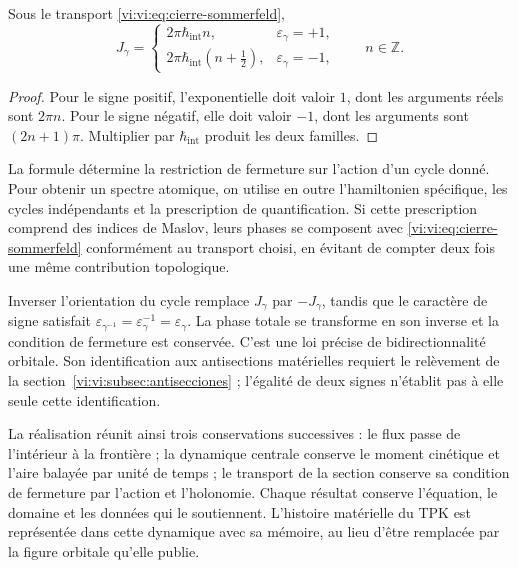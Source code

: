 \begin{theorem}
\label{vi:vi:thm:sommerfeld}
Sous le transport \eqref{vi:vi:eq:cierre-sommerfeld},
\begin{equation}
 J_\gamma=
 \begin{cases}
  2\pi\hbar_{\mathrm{int}}n,
          &\varepsilon_\gamma=+1,\\[1mm]
  2\pi\hbar_{\mathrm{int}}(n+\tfrac12),
          &\varepsilon_\gamma=-1,
 \end{cases}
 \qquad n\in\mathbb Z.
 \label{vi:vi:eq:accion-sommerfeld}
\end{equation}
\end{theorem}
\begin{proof}
Pour le signe positif, l'exponentielle doit valoir $1$, dont les
arguments réels sont $2\pi n$. Pour le signe négatif, elle doit
valoir $-1$, dont les arguments sont $(2n+1)\pi$. Multiplier
par $\hbar_{\mathrm{int}}$ produit les deux familles.
\end{proof}

La formule détermine la restriction de fermeture sur
l’action d’un cycle donné. Pour obtenir un spectre atomique,
on utilise en outre l’hamiltonien spécifique, les cycles
indépendants et la prescription de quantification. Si cette
prescription comprend des indices de Maslov, leurs phases se
composent avec \eqref{vi:vi:eq:cierre-sommerfeld} conformément au
transport choisi, en évitant de compter deux fois une même
contribution topologique.

Inverser l’orientation du cycle remplace $J_\gamma$ par
$-J_\gamma$, tandis que le caractère de signe satisfait
$\varepsilon_{\gamma^{-1}}=\varepsilon_\gamma^{-1}
=\varepsilon_\gamma$. La phase totale se transforme en son
inverse et la condition de fermeture est conservée. C’est une
loi précise de bidirectionnalité orbitale. Son identification
aux antisections matérielles requiert le relèvement
de la section~\ref{vi:vi:subsec:antisecciones} ; l’égalité
de deux signes n’établit pas à elle seule cette identification.

La réalisation réunit ainsi trois conservations
successives : le flux passe de l'intérieur à la frontière ;
la dynamique centrale conserve le moment cinétique et l'aire
balayée par unité de temps ; le transport de la section
conserve sa condition de fermeture par l'action et
l'holonomie. Chaque résultat conserve l'équation, le domaine
et les données qui le soutiennent. L'histoire matérielle du
TPK est représentée dans cette dynamique avec sa mémoire, au lieu
d'être remplacée par la figure orbitale qu'elle publie.

